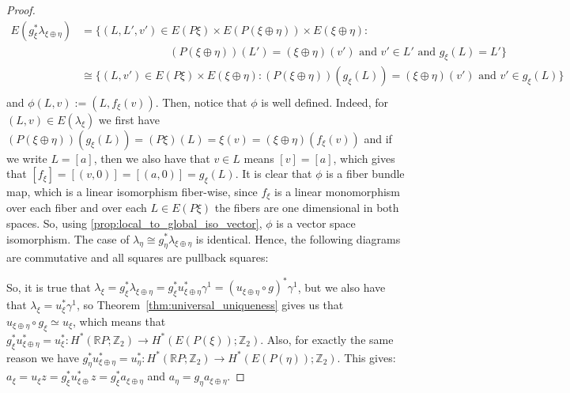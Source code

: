 \begin{proof}
\begin{align*}
E(g_{\xi}^*\lambda_{\xi\oplus\eta})&=\big\{(L,L',v')\in E(P\xi)\times E(P(\xi\oplus\eta))\times E(\xi\oplus\eta):\\
&\qquad\qquad\qquad\qquad(P(\xi\oplus\eta))(L')=(\xi\oplus\eta)(v')\text{ and }v'\in L'\text{ and }g_{\xi}(L)=L'\big\}\\
&\cong\big\{(L,v')\in E(P\xi)\times E(\xi\oplus\eta):(P(\xi\oplus\eta))(g_{\xi}(L))=(\xi\oplus\eta)(v')\text{ and }v'\in g_{\xi}(L)\big\}\\
\end{align*}
and $\phi(L,v):=(L,f_{\xi}(v))$. Then, notice that $\phi$ is well defined. Indeed, for $(L,v)\in E(\lambda_{\xi})$ we first have $(P(\xi\oplus\eta))(g_{\xi}(L))=(P\xi)(L)=\xi(v)=(\xi\oplus\eta)(f_{\xi}(v))$ and if we write $L=[a]$, then we also have that $v\in L$ means $[v]=[a]$, which gives that $[f_{\xi}]=[(v,0)]=[(a,0)]=g_{\xi}(L)$. It is clear that $\phi$ is a fiber bundle map, which is a linear isomorphism fiber-wise, since $f_{\xi}$ is a linear monomorphism over each fiber and over each $L\in E(P\xi)$ the fibers are one dimensional in both spaces. So, using \ref{prop:local_to_global_iso_vector}, $\phi$ is a vector space isomorphism. The case of $\lambda_{\eta}\cong g^*_{\eta}\lambda_{\xi\oplus\eta}$ is identical. Hence, the following diagrams are commutative and all squares are pullback squares:
\begin{center}
\end{center}
So, it is true that $\lambda_{\xi}=g_{\xi}^*\lambda_{\xi\oplus\eta}=g_{\xi}^*u_{\xi\oplus\eta}^*\gamma^1=(u_{\xi\oplus\eta}\circ g)^*\gamma^1$, but we also have that $\lambda_{\xi}=u^*_{\xi}\gamma^1$, so Theorem~\ref{thm:universal_uniqueness} gives us that $u_{\xi\oplus\eta}\circ g_{\xi}\simeq u_{\xi}$, which means that $g_{\xi}^*u^*_{\xi\oplus\eta}=u^*_{\xi}:H^*(\mathbb{R}P;\mathbb{Z}_2)\to H^*(E(P(\xi));\mathbb{Z}_2)$. Also, for exactly the same reason we have $g_{\eta}^*u^*_{\xi\oplus\eta}=u^*_{\eta}:H^*(\mathbb{R}P;\mathbb{Z}_2)\to H^*(E(P(\eta));\mathbb{Z}_2)$. This gives: $a_{\xi}=u_{\xi}z=g_{\xi}^*u^*_{\xi\oplus}z=g_{\xi}^*a_{\xi\oplus\eta}$ and $a_{\eta}=g_{\eta}a_{\xi\oplus\eta}$.


\end{proof}
